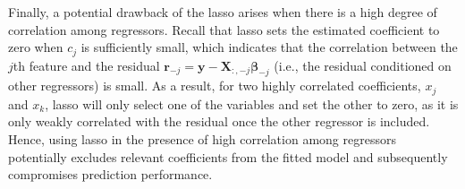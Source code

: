 
\noindent Finally, a potential drawback of the lasso arises when there is a high degree of correlation among regressors. Recall that lasso sets the estimated coefficient to zero when $c_j$ is sufficiently small, which indicates that the correlation between the $j$th feature and the residual $\mathbf{r}_{-j}=\mathbf{y}-\mathbf{X}_{:,-j} \mathbf{\beta}_{-j}$ (i.e., the residual conditioned on other regressors) is small. As a result, for two highly correlated coefficients, $x_j$ and $x_k$, lasso will only select one of the variables and set the other to zero, as it is only weakly correlated with the residual once the other regressor is included. Hence, using lasso in the presence of high correlation among regressors potentially excludes relevant coefficients from the fitted model and subsequently compromises prediction performance. 

